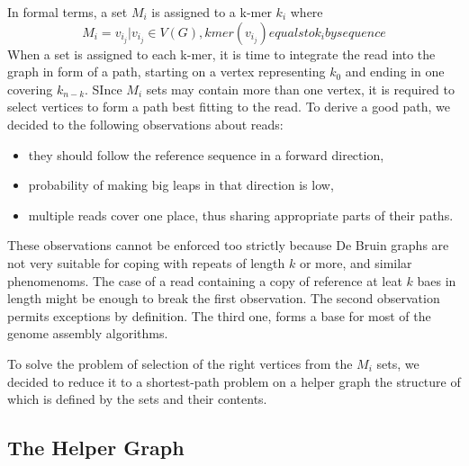 In formal terms, a set $M_i$ is assigned to a k-mer $k_i$ where
$$
M_i = {v_{i_j} | v_{i_j} \in V(G), kmer(v_{i_j}) equals to k_i by sequence}
$$ 
When a set is assigned to each k-mer, it is time to integrate the read into the graph in form of a path, starting on a vertex representing $k_0$ and ending in one covering $k_{n-k}$. SInce $M_i$ sets may contain more than one vertex, it is required to select vertices to form a path best fitting to the read. To derive a good path, we decided to the following observations about reads:
\begin{itemize}
\item they should follow the reference sequence in a forward direction,
\item probability of making big leaps in that direction is low,
\item multiple reads cover one place, thus sharing appropriate parts of their paths.
\end{itemize}

These observations cannot be enforced too strictly because De Bruin graphs are not very suitable for coping with repeats of length $k$ or more, and similar phenomenoms. The case of a read containing a copy of reference at leat $k$ baes in length might be enough to break the first observation. The second observation permits exceptions by definition. The third one, forms a base for most of the genome assembly algorithms.

To solve the problem of selection of the right vertices from the $M_i$ sets, we decided to reduce it to a shortest-path problem on a helper graph the structure of which is defined by the sets and their contents.

\subsection{The Helper Graph}
\label{subsec:helper-graph}



